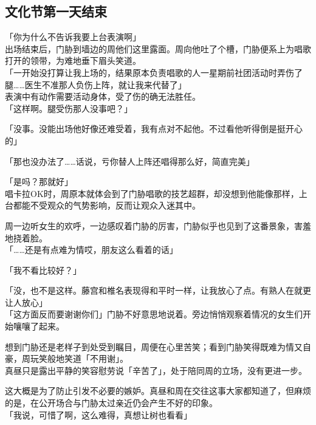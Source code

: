 \subsection{文化节第一天结束}

「你为什么不告诉我要上台表演啊」\\

出场结束后，门胁到墙边的周他们这里露面。周向他吐了个槽，门胁便系上为唱歌打开的领带，为难地垂下眉头笑道。\\

「一开始没打算让我上场的，结果原本负责唱歌的人一星期前社团活动时弄伤了腿……医生不准那人负伤上阵，就让我来代替了」\\

表演中有动作需要活动身体，受了伤的确无法胜任。\\

「这样啊。腿受伤那人没事吧？」

「没事。没能出场他好像还难受着，我有点对不起他。不过看他听得倒是挺开心的」

「那也没办法了……话说，亏你替人上阵还唱得那么好，简直完美」

「是吗？那就好」\\

唱卡拉OK时，周原本就体会到了门胁唱歌的技艺超群，却没想到他能像那样，上台都能不受观众的气势影响，反而让观众入迷其中。

周一边听女生的欢呼，一边感叹着门胁的厉害，门胁似乎也见到了这番景象，害羞地挠着脸。\\

「……还是有点难为情哎，朋友这么看着的话」

「我不看比较好？」

「没，也不是这样。藤宫和椎名表现得和平时一样，让我放心了点。有熟人在就更让人放心」\\

「这方面反而要谢谢你们」门胁不好意思地说着。旁边悄悄观察着情况的女生们开始嚷嚷了起来。

想到门胁还是老样子到处受到瞩目，周便在心里苦笑；看到门胁笑得既难为情又自豪，周玩笑般地笑道「不用谢」。\\

真昼只是露出平静的笑容慰劳说「辛苦了」，处于陪同周的立场，没有更进一步。

这大概是为了防止引发不必要的嫉妒。真昼和周在交往这事大家都知道了，但麻烦的是，在公开场合与门胁太过亲近仍会产生不好的印象。\\

「我说，可惜了啊，这么难得，真想让树也看看」

